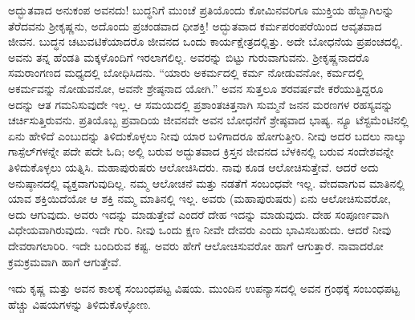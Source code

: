 ಅದ್ಭುತವಾದ ಅನುಕಂಪ ಅವನದು! ಬುದ್ಧನಿಗೆ ಮುಂಚೆ ಪ್ರತಿಯೊಂದು ಕೋಮಿನವರಿಗೂ ಮುಕ್ತಿಯ ಹೆಬ್ಬಾಗಿಲನ್ನು ತೆರೆದವನು ಶ‍್ರೀಕೃಷ್ಣನು, ಅದೊಂದು ಪ್ರಚಂಡವಾದ ಧೀಶಕ್ತಿ! ಅದ್ಭುತವಾದ ಕರ್ಮಪರಂಪರೆಯಿಂದ ಆವೃತವಾದ ಜೀವನ. ಬುದ್ಧನ ಚಟುವಟಿಕೆಯಾದರೊ ಜೀವನದ ಒಂದು ಕಾರ್ಯಕ್ಷೇತ್ರದಲ್ಲಿತ್ತು. ಅದೇ ಬೋಧನೆಯ ಪ್ರಪಂಚದಲ್ಲಿ. ಅವನು ತನ್ನ ಹೆಂಡತಿ ಮಕ್ಕಳೊಂದಿಗೆ ಇರಲಾಗಲಿಲ್ಲ. ಅವರನ್ನು ಬಿಟ್ಟು ಗುರುವಾಗುವನು. ಶ‍್ರೀಕೃಷ್ಣನಾದರೊ ಸಮರಾಂಗಣದ ಮಧ್ಯದಲ್ಲಿ ಬೋಧಿಸಿದನು. “ಯಾರು ಅಕರ್ಮದಲ್ಲಿ ಕರ್ಮ ನೋಡುವನೋ, ಕರ್ಮದಲ್ಲಿ ಅಕರ್ಮವನ್ನು ನೋಡುವನೋ, ಅವನೇ ಶ್ರೇಷ್ಠನಾದ ಯೋಗಿ.” ಅವನ ಸುತ್ತಲೂ ಶರವರ್ಷವೇ ಕರೆಯುತ್ತಿದ್ದರೂ ಅದನ್ನು ಆತ ಗಮನಿಸುವುದೇ ಇಲ್ಲ. ಆ ಸಮಯದಲ್ಲಿ ಪ್ರಶಾಂತಚಿತ್ತನಾಗಿ ಸುಮ್ಮನೆ ಜನನ ಮರಣಗಳ ರಹಸ್ಯವನ್ನು ಚರ್ಚಿಸುತ್ತಿರುವನು. ಪ್ರತಿಯೊಬ್ಬ ಪ್ರವಾದಿಯ ಜೀವನವೇ ಅವನ ಬೋಧನೆಗೆ ಶ್ರೇಷ್ಠವಾದ ಭಾಷ್ಯ. ನ್ಯೂ ಟೆಸ್ಟಮೆಂಟಿನಲ್ಲಿ ಏನು ಹೇಳಿದೆ ಎಂಬುದನ್ನು ತಿಳಿದುಕೊಳ್ಳಲು ನೀವು ಯಾರ ಬಳಿಗಾದರೂ ಹೋಗುತ್ತೀರಿ. ನೀವು ಅದರ ಬದಲು ನಾಲ್ಕು ಗಾಸ್ಪೆಲ್​ಗಳನ್ನೇ ಪದೇ ಪದೇ ಓದಿ; ಅಲ್ಲಿ ಬರುವ ಅದ್ಭುತವಾದ ಕ್ರಿಸ್ತನ ಜೀವನದ ಬೆಳಕಿನಲ್ಲಿ ಬರುವ ಸಂದೇಶವನ್ನೇ ತಿಳಿದುಕೊಳ್ಳಲು ಯತ್ನಿಸಿ. ಮಹಾಪುರುಷರು ಆಲೋಚಿಸಿದರು. ನಾವು ಕೂಡ ಆಲೋಚಿಸುತ್ತೇವೆ. ಆದರೆ ಅದು ಅನುಷ್ಠಾನದಲ್ಲಿ ವ್ಯಕ್ತವಾಗುವುದಿಲ್ಲ. ನಮ್ಮ ಆಲೋಚನೆ ಮತ್ತು ನಡತೆಗೆ ಸಂಬಂಧವೇ ಇಲ್ಲ. ವೇದವಾಗುವ ಮಾತಿನಲ್ಲಿ ಯಾವ ಶಕ್ತಿಯಿದೆಯೋ ಆ ಶಕ್ತಿ ನಮ್ಮ ಮಾತಿನಲ್ಲಿ ಇಲ್ಲ. ಅವರು (ಮಹಾಪುರುಷರು) ಏನು ಆಲೋಚಿಸುವರೋ, ಅದು ಆಗುವುದು. ಅವರು ಇದನ್ನು ಮಾಡುತ್ತೇವೆ ಎಂದರೆ ದೇಹ ಇದನ್ನು ಮಾಡುವುದು. ದೇಹ ಸಂಪೂರ್ಣವಾಗಿ ವಿಧೇಯವಾಗಿರುವುದು. ಇದೇ ಗುರಿ. ನೀವು ಒಂದು ಕ್ಷಣ ನೀವೇ ದೇವರು ಎಂದು ಭಾವಿಸಬಹುದು. ಆದರೆ ನೀವು ದೇವರಾಗಲಾರಿರಿ. ಇದೇ ಬಂದಿರುವ ಕಷ್ಟ. ಅವರು ಹೇಗೆ ಆಲೋಚಿಸುವರೋ ಹಾಗೆ ಆಗುತ್ತಾರೆ. ನಾವಾದರೋ ಕ್ರಮಕ್ರಮವಾಗಿ ಹಾಗೆ ಆಗುತ್ತೇವೆ.

ಇದು ಕೃಷ್ಣ ಮತ್ತು ಅವನ ಕಾಲಕ್ಕೆ ಸಂಬಂಧಪಟ್ಟ ವಿಷಯ. ಮುಂದಿನ ಉಪನ್ಯಾಸದಲ್ಲಿ ಅವನ ಗ್ರಂಥಕ್ಕೆ ಸಂಬಂಧಪಟ್ಟ ಹೆಚ್ಚು ವಿಷಯಗಳನ್ನು ತಿಳಿದುಕೊಳ್ಳೋಣ.

